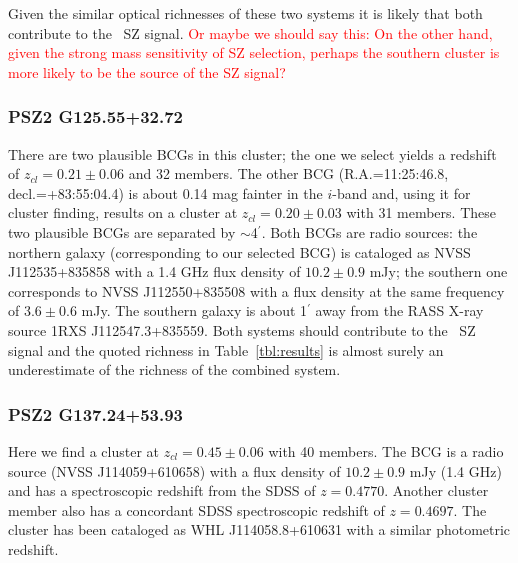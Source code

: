 \documentclass[apj, revtex4-1]{emulateapj}
\newcommand{\editorial}[1]{\textcolor{red}{#1}}
\begin{document}
Given the similar optical richnesses of these two systems it is likely that both contribute to the \planck\ SZ signal.  \editorial{Or maybe we should say this: On the other hand, given the strong mass sensitivity of SZ selection, perhaps the southern cluster is more likely to be the source of the SZ signal?}

\subsubsection{PSZ2 G125.55+32.72} %
There are two plausible BCGs in this cluster; the one we select yields a redshift of $z_{cl} = 0.21 \pm 0.06$ and 32 members.  The other BCG (R.A.=11:25:46.8, decl.=+83:55:04.4) is about 0.14 mag fainter in the $i$-band and, using it for cluster finding, results on a cluster at $z_{cl} = 0.20 \pm 0.03$ with 31 members.  These two plausible BCGs are separated by $\sim$4$^\prime$. Both BCGs are radio sources: the northern galaxy (corresponding to our selected BCG) is cataloged as NVSS J112535+835858 with a 1.4 GHz flux density of $10.2 \pm 0.9$ mJy; the southern one corresponds to NVSS J112550+835508 with a flux density at the same frequency of $3.6 \pm 0.6$ mJy. The southern galaxy is about 1$^\prime$ away from the RASS X-ray source  1RXS J112547.3+835559.  Both systems should contribute to the \planck\ SZ signal and the quoted richness in Table~\ref{tbl:results} is almost surely an underestimate of the richness of the combined system.


\subsubsection{PSZ2 G137.24+53.93} %
Here we find a cluster at $z_{cl} = 0.45 \pm 0.06$ with 40 members.  The BCG is a radio source (NVSS J114059+610658) with a flux density of $10.2 \pm 0.9$ mJy (1.4 GHz) and has a spectroscopic redshift from the SDSS of $z=0.4770$.  Another cluster member also has a concordant SDSS spectroscopic redshift of $z=0.4697$.  The cluster has been cataloged as WHL J114058.8+610631 with a similar photometric redshift.
\end{document}
